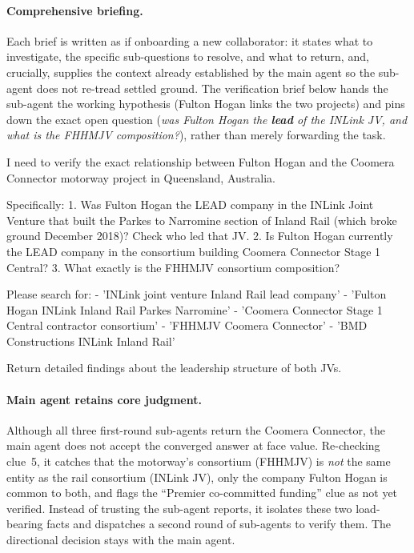 \documentclass{llmxive}
\begin{document}
\paragraph{Comprehensive briefing.} Each brief is written as if onboarding a new collaborator: it states what to investigate, the specific sub-questions to resolve, and what to return, and, crucially, supplies the context already established by the main agent so the sub-agent does not re-tread settled ground. The verification brief below hands the sub-agent the working hypothesis (Fulton Hogan links the two projects) and pins down the exact open question (\emph{was Fulton Hogan the \textbf{lead} of the INLink JV, and what is the FHHMJV composition?}), rather than merely forwarding the task.

\begin{tcolorbox}[breakable,enhanced jigsaw,colback=purple!6,colframe=purple!55,boxrule=0.4pt,left=5pt,right=5pt,top=3pt,bottom=3pt,fonttitle=\bfseries\sffamily\small,coltitle=black,fontupper=\small,title={Brief dispatched to a sub-agent}]
I need to verify the exact relationship between Fulton Hogan and the Coomera Connector motorway project in Queensland, Australia.

Specifically:
1. Was Fulton Hogan the LEAD company in the INLink Joint Venture that built the Parkes to Narromine section of Inland Rail (which broke ground December 2018)? Check who led that JV.
2. Is Fulton Hogan currently the LEAD company in the consortium building Coomera Connector Stage 1 Central?
3. What exactly is the FHHMJV consortium composition?

Please search for:
- 'INLink joint venture Inland Rail lead company'
- 'Fulton Hogan INLink Inland Rail Parkes Narromine'
- 'Coomera Connector Stage 1 Central contractor consortium'
- 'FHHMJV Coomera Connector'
- 'BMD Constructions INLink Inland Rail'

Return detailed findings about the leadership structure of both JVs.
\end{tcolorbox}

\paragraph{Main agent retains core judgment.} Although all three first-round sub-agents return the Coomera Connector, the main agent does not accept the converged answer at face value. Re-checking clue~5, it catches that the motorway's consortium (FHHMJV) is \emph{not} the same entity as the rail consortium (INLink JV), only the company Fulton Hogan is common to both, and flags the ``Premier co-committed funding'' clue as not yet verified. Instead of trusting the sub-agent reports, it isolates these two load-bearing facts and dispatches a second round of sub-agents to verify them. The directional decision stays with the main agent.
\end{document}
